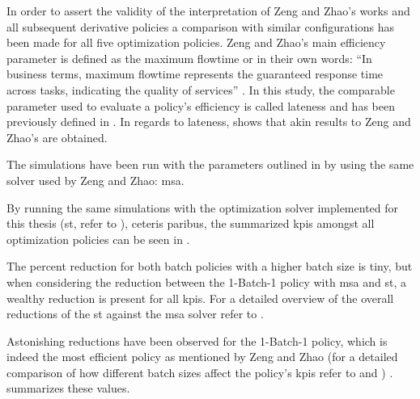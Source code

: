 \documentclass{seal_thesis}
\begin{document}
In order to assert the validity of the interpretation of Zeng and Zhao's works and all subsequent derivative policies a comparison with similar configurations has been made for all five optimization policies. Zeng and Zhao's main efficiency parameter is defined as the maximum flowtime or in their own words: ``In business terms, maximum flowtime represents the guaranteed response time across tasks, indicating the quality of services'' \cite[p. 17]{Zeng2005}. In this study, the comparable parameter used to evaluate a policy's efficiency is called lateness and has been previously defined in . In regards to lateness,  shows that akin results to Zeng and Zhao's are obtained.


The simulations have been run with the parameters outlined in  by using the same solver used by Zeng and Zhao: \gls{msa}.

By running the same simulations with the optimization solver implemented for this thesis (\ie \gls{st}, refer to ), ceteris paribus, the summarized \glspl{kpi} amongst all optimization policies can be seen in .


The percent reduction for both batch policies with a higher batch size is tiny, but when considering the reduction between the 1-Batch-1 policy with \gls{msa} and \gls{st}, a wealthy reduction is present for all \glspl{kpi}. For a detailed overview of the overall reductions of the \gls{st} against the \gls{msa} solver refer to .


Astonishing reductions have been observed for the 1-Batch-1 policy, which is indeed the most efficient policy as mentioned by Zeng and Zhao (for a detailed comparison of how different batch sizes affect the policy's \glspl{kpi} refer to  and ) \cite[p. 24]{Zeng2005}.  summarizes these values.
\end{document}
